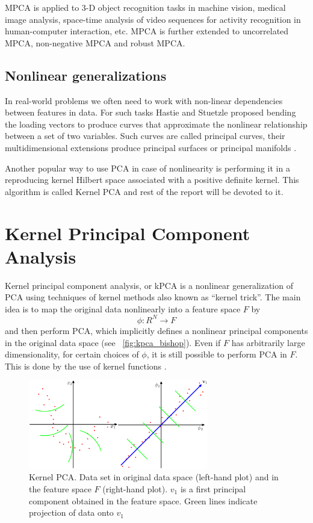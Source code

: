 MPCA is applied to 3-D object recognition tasks \citep{sahambi} in machine vision, medical image analysis, space-time analysis of video sequences for activity recognition \citep{green} in human-computer interaction, etc.  MPCA is further extended to uncorrelated MPCA, non-negative MPCA and robust MPCA.

\subsection{Nonlinear generalizations}
In real-world problems we often need to work with non-linear dependencies between features in data. For such tasks Hastie and Stuetzle \citep{hastie} proposed bending the loading
vectors to produce curves that approximate the nonlinear relationship between
a set of two variables. Such curves are called principal curves, their multidimensional extensions produce principal surfaces or principal manifolds \citep{gorban}.

Another popular way to use PCA in case of nonlinearity is performing it in a reproducing kernel Hilbert space associated with a positive definite kernel. 
This algorithm is called Kernel PCA and rest of the report will be devoted to it.

\section{Kernel Principal Component Analysis}
Kernel principal component analysis, or kPCA is a nonlinear generalization of PCA using techniques of kernel methods also known as ``kernel trick''. The main idea is to map the original data nonlinearly into a feature space $F$ by 
\begin{equation}
\phi: R^N \rightarrow F 
\end{equation}
and then perform PCA, which implicitly defines a nonlinear
principal components in the original data space (see ~\autoref{fig:kpca_bishop}). Even if $F$ has arbitrarily large dimensionality, for certain choices of $\phi$, it is still possible to perform PCA in $F$. This is done by the use of kernel functions \citep*{original_paper}.

\begin{figure}[ht]
	\centering
	\includegraphics[width=0.7\textwidth]{img/kpca_example_from_bishop.png}
	\caption{\label{fig:kpca_bishop}Kernel PCA. Data set in original data space (left-hand plot) and in the feature space $F$ (right-hand plot). \boldmath$v_1$ is a first principal component obtained in the feature space. Green lines indicate projection of data onto \boldmath$v_1$ \citep{bishop}}
\end{figure}


